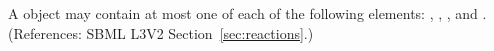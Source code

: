 A \Reaction object may contain at most one of each of the following
elements: , ,
, and .  (References: SBML L3V2
Section~\ref{sec:reactions}.)
